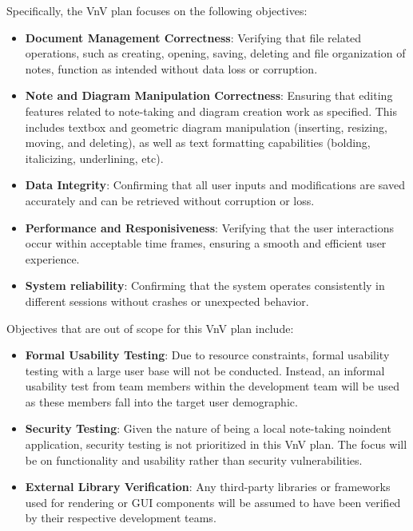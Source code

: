 \documentclass[12pt, titlepage]{article}
\begin{document}
\noindent Specifically, the VnV plan focuses on the following objectives:
\begin{itemize}
  \item \textbf{Document Management Correctness}: Verifying that file related operations,
  such as creating, opening, saving, deleting and file organization of notes,
  function as intended without data loss or corruption.
  \item \textbf{Note and Diagram Manipulation Correctness}: Ensuring that editing features
  related to note-taking and diagram creation work as specified. This includes
  textbox and geometric diagram manipulation (inserting, resizing, moving, and
  deleting), as well as text formatting capabilities (bolding, italicizing,
  underlining, etc).
  \item \textbf{Data Integrity}: Confirming that all user inputs and modifications are saved
  accurately and can be retrieved without corruption or loss.
  \item \textbf{Performance and Responisiveness}: Verifying that the user interactions occur
  within acceptable time frames, ensuring a smooth and efficient user experience.
  \item \textbf{System reliability}: Confirming that the system operates consistently in
  different sessions without crashes or unexpected behavior.

\end{itemize}
\vspace{1em}

\noindent Objectives that are out of scope for this VnV plan include:
\begin{itemize}
  \item \textbf{Formal Usability Testing}: Due to resource constraints, formal usability testing
  with a large user base will not be conducted. Instead, an informal usability test from
  team members within the development team will be used as these members fall into
  the target user demographic.
  \item \textbf{Security Testing}: Given the nature of \progname{} being a local note-taking
noindent  application, security testing is not prioritized in this VnV plan. The focus
  will be on functionality and usability rather than security vulnerabilities.
  \item \textbf{External Library Verification}: Any third-party libraries or frameworks used
  for rendering or GUI components will be assumed to have been verified by their
  respective development teams.
\end{itemize}
\end{document}
